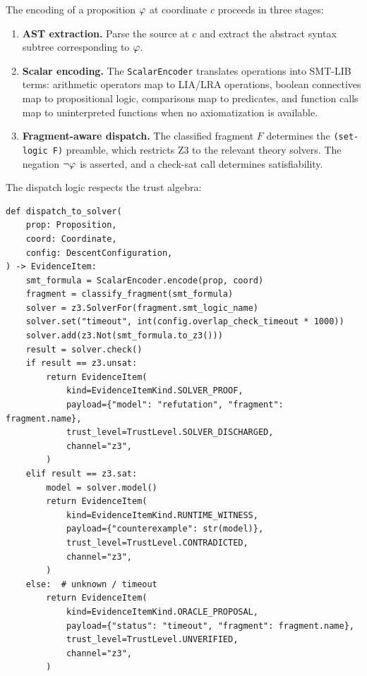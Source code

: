 \begin{construction}\label{con:encoding}
The encoding of a proposition $\varphi$ at coordinate $c$ proceeds in
three stages:
\begin{enumerate}[nosep]
  \item \textbf{AST extraction.}
    Parse the \Python{} source at $c$ and extract the abstract syntax
    subtree corresponding to $\varphi$.
  \item \textbf{Scalar encoding.}
    The \texttt{ScalarEncoder} translates \Python{} operations into
    SMT-LIB terms: arithmetic operators map to LIA/LRA operations,
    boolean connectives map to propositional logic, comparisons map
    to predicates, and function calls map to uninterpreted functions
    when no axiomatization is available.
  \item \textbf{Fragment-aware dispatch.}
    The classified fragment $F$ determines the \texttt{(set-logic F)}
    preamble, which restricts Z3 to the relevant theory solvers.
    The negation $\neg \varphi$ is asserted, and a check-sat call
    determines satisfiability.
\end{enumerate}
\end{construction}

The dispatch logic respects the trust algebra:

\begin{lstlisting}[style=jugeo-python,
  caption={SMT dispatch with trust integration.},
  label={lst:dispatch}]
def dispatch_to_solver(
    prop: Proposition,
    coord: Coordinate,
    config: DescentConfiguration,
) -> EvidenceItem:
    smt_formula = ScalarEncoder.encode(prop, coord)
    fragment = classify_fragment(smt_formula)
    solver = z3.SolverFor(fragment.smt_logic_name)
    solver.set("timeout", int(config.overlap_check_timeout * 1000))
    solver.add(z3.Not(smt_formula.to_z3()))
    result = solver.check()
    if result == z3.unsat:
        return EvidenceItem(
            kind=EvidenceItemKind.SOLVER_PROOF,
            payload={"model": "refutation", "fragment": fragment.name},
            trust_level=TrustLevel.SOLVER_DISCHARGED,
            channel="z3",
        )
    elif result == z3.sat:
        model = solver.model()
        return EvidenceItem(
            kind=EvidenceItemKind.RUNTIME_WITNESS,
            payload={"counterexample": str(model)},
            trust_level=TrustLevel.CONTRADICTED,
            channel="z3",
        )
    else:  # unknown / timeout
        return EvidenceItem(
            kind=EvidenceItemKind.ORACLE_PROPOSAL,
            payload={"status": "timeout", "fragment": fragment.name},
            trust_level=TrustLevel.UNVERIFIED,
            channel="z3",
        )
\end{lstlisting}

